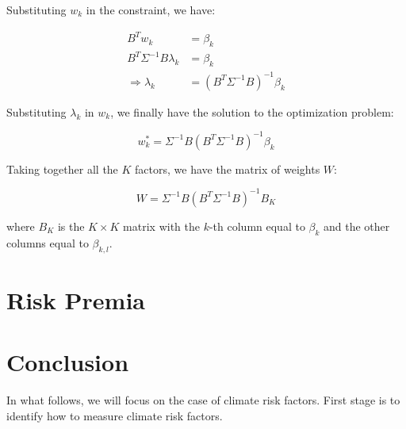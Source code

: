 Substituting $w_k$ in the constraint, we have:

\begin{equation}
    \begin{aligned}
        B^T w_k &= \beta_k \\
        B^T \Sigma^{-1} B \lambda_k &= \beta_k \\
        \Rightarrow \lambda_k &= (B^T \Sigma^{-1} B)^{-1} \beta_k
    \end{aligned}
\end{equation}

Substituting $\lambda_k$ in $w_k$, we finally have 
the solution to the optimization problem:

\begin{equation}
    w_k^* = \Sigma^{-1} B (B^T \Sigma^{-1} B)^{-1} \beta_k
\end{equation}

Taking together all the $K$ factors, we have the matrix of weights $W$:

\begin{equation}
    W = \Sigma^{-1} B (B^T \Sigma^{-1} B)^{-1} B_K
\end{equation}

where $B_K$ is the $K \times K$ matrix with the $k$-th column equal to $\beta_k$ and the other columns equal to $\beta_{k,l}$.

\section{Risk Premia}

\section{Conclusion}

In what follows, we will focus 
on the case of climate risk factors.
First stage is to identify how to measure 
climate risk factors.
